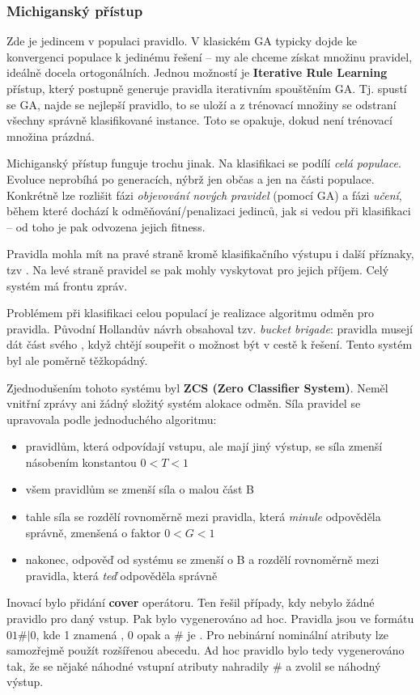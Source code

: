 \subsubsection{Michiganský přístup}
Zde je jedincem v populaci pravidlo. V klasickém GA typicky dojde ke konvergenci populace k jedinému řešení -- my ale chceme získat množinu pravidel, ideálně docela ortogonálních. Jednou možností je \textbf{Iterative Rule Learning} přístup, který postupně generuje pravidla iterativním spouštěním GA. Tj. spustí se GA, najde se nejlepší pravidlo, to se uloží a z trénovací množiny se odstraní všechny správně klasifikované instance. Toto se opakuje, dokud není trénovací množina prázdná.

Michiganský přístup funguje trochu jinak. Na klasifikaci se podílí \textit{celá populace}. Evoluce neprobíhá po generacích, nýbrž jen občas a jen na části populace. Konkrétně lze rozlišit fázi \textit{objevování nových pravidel} (pomocí GA) a fázi \textit{učení}, během které dochází k odměňování/penalizaci jedinců, jak si vedou při klasifikaci -- od toho je pak odvozena jejich fitness.

Pravidla mohla mít na pravé straně kromě klasifikačního výstupu i další příznaky, tzv . Na levé straně pravidel se pak mohly vyskytovat  pro jejich příjem. Celý systém má frontu zpráv.

Problémem při klasifikaci celou populací je realizace algoritmu odměn pro pravidla. Původní Hollandův návrh obsahoval tzv. \textit{bucket brigade}: pravidla musejí dát část svého , když chtějí soupeřit o možnost být v cestě k řešení. Tento systém byl ale poměrně těžkopádný. 

Zjednodušením tohoto systému byl \textbf{ZCS (Zero Classifier System)}. Neměl vnitřní zprávy ani žádný složitý systém alokace odměn. Síla pravidel se upravovala podle jednoduchého algoritmu:
\begin{itemize}
	
	
	\item pravidlům, která odpovídají vstupu, ale mají jiný výstup, se síla zmenší násobením konstantou $0 < T < 1$
	\item všem pravidlům se zmenší síla o malou část B
	\item tahle síla se rozdělí rovnoměrně mezi pravidla, která \textit{minule} odpověděla správně, zmenšená o faktor $0<G<1$
	\item nakonec, odpověď od systému se zmenší o B a rozdělí rovnoměrně mezi pravidla, která \textit{teď} odpověděla správně
\end{itemize}
Inovací bylo přidání \textbf{cover} operátoru. Ten řešil případy, kdy nebylo žádné pravidlo pro daný vstup. Pak bylo vygenerováno ad hoc. Pravidla jsou ve formátu $01\#|0$, kde 1 znamená , 0 opak a $\#$ je . Pro nebinární nominální atributy lze samozřejmě použít rozšířenou abecedu. Ad hoc pravidlo bylo tedy vygenerováno tak, že se nějaké náhodné vstupní atributy nahradily $\#$ a zvolil se náhodný výstup.

